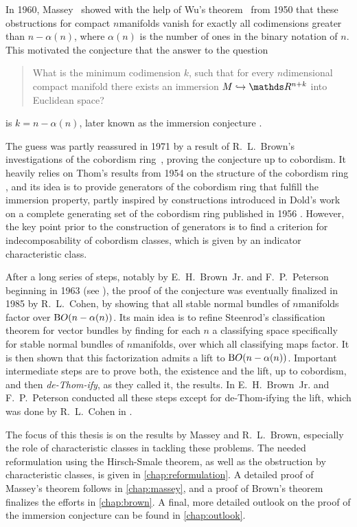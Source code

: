 In 1960, Massey~\cite{massey} showed with the help of Wu's
theorem~\cite{wu} from 1950 that these obstructions for compact
$n$\nbd{}manifolds vanish for exactly all codimensions greater than
$n-\alpha(n)$, where $\alpha(n)$ is the number of ones in the binary
notation of $n$.
This motivated the conjecture that the answer to the question
\begin{quote}
    What is the minimum codimension $k$, such that for every
    $n$\nbd{}dimensional compact manifold there exists an
    immersion $M\immto\R^{n+k}$ into Euclidean space?
\end{quote}
is $k=n-\alpha(n)$, later known as the immersion conjecture
\cite{cohen}.

The guess was partly reassured in 1971 by a result of R.~L.~Brown's
investigations of the cobordism ring~\cite{brown}, proving the
conjecture up to cobordism. It heavily relies on Thom's results from
1954 on the structure of the cobordism ring \cite{thomfrench},
and its idea is to provide generators of the
cobordism ring that fulfill the immersion property, partly inspired by
constructions introduced in Dold's work on a complete generating set
of the cobordism ring published in 1956 \cite{dold}.
However, the key point prior to the construction of generators is to
find a criterion for indecomposability of cobordism classes, which is
given by an indicator characteristic class.

After a long series of steps, notably by E.~H.~Brown~Jr. and
F.~P.~Peterson beginning in 1963 (see \cite{cohen}), the proof of the
conjecture was eventually finalized in 1985 by R.~L.~Cohen, by showing
that all stable normal bundles of $n$\nbd{}manifolds factor over
$\mathrm{B}O(n-\alpha(n))$.
Its main idea is to refine Steenrod's classification theorem for
vector bundles by finding for each $n$ a classifying space specifically
for stable normal bundles of $n$\nbd{}manifolds, over which all classifying
maps factor. It is then shown that this factorization admits a lift to
$\mathrm{B}O(n-\alpha(n))$.
Important intermediate steps are to prove both, the existence and the
lift, up to cobordism, and then \emph{de-Thom-ify}, as they called it,
the results.
In \cite{brownpeterson} E.~H.~Brown~Jr. and F.~P.~Peterson conducted
all these steps except for de-Thom-ifying the lift,
which was done by R.~L.~Cohen in \cite{cohen}.

The focus of this thesis is on the results by Massey and
R.~L.~Brown, especially the role of characteristic classes in tackling
these problems.
The needed reformulation using the Hirsch-Smale theorem, as well as
the obstruction by characteristic classes, is given in
\autoref{chap:reformulation}.
A detailed proof of Massey's theorem follows in \autoref{chap:massey},
and a proof of Brown's theorem finalizes the efforts in
\autoref{chap:brown}.
A final, more detailed outlook on the proof of the immersion
conjecture can be found in \autoref{chap:outlook}.


